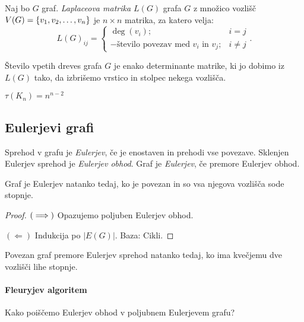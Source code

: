 \begin{definicija}
    Naj bo $G$ graf. \emph{Laplaceova matrika $L(G)$} grafa $G$ z množico vozlišč $V(G) = \left\{v_1, v_2, \ldots, v_n\right\}$ je $n \times n$ matrika, za katero velja: $$L(G)_{ij} = \begin{cases}
        \deg(v_i); &i=j \\ - \text{število povezav med $v_i$ in $v_j$}; &i \neq j
    \end{cases}.$$
\end{definicija}

\begin{izrek}
    Število vpetih dreves grafa $G$ je enako determinante matrike, ki jo dobimo iz $L(G)$ tako, da izbrišemo vrstico in stolpec nekega vozlišča.
\end{izrek}

\begin{izrek}[Cayley]
    $\tau(K_n) = n^{n-2}$
\end{izrek}

\subsection{Eulerjevi grafi}
\begin{definicija}
    Sprehod v grafu je \emph{Eulerjev}, če je enostaven in prehodi vse povezave. Sklenjen Eulerjev sprehod je \emph{Eulerjev obhod}. Graf je \emph{Eulerjev}, če premore Eulerjev obhod.
\end{definicija}

\begin{izrek}
    Graf je Eulerjev natanko tedaj, ko je povezan in so vsa njegova vozlišča sode stopnje.
\end{izrek}

\begin{proof}
    $(\implies)$ Opazujemo poljuben Eulerjev obhod.

    $(\Leftarrow)$ Indukcija po $|E(G)|$. Baza: Cikli.
\end{proof}

\begin{izrek}
    Povezan graf premore Eulerjev sprehod natanko tedaj, ko ima kvečjemu dve vozlišči lihe stopnje.
\end{izrek}

\paragraph{Fleuryjev algoritem} Kako poiščemo Eulerjev obhod v poljubnem Eulerjevem grafu?


